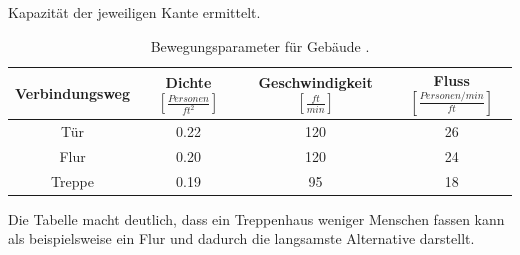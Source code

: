 \documentclass[a4paper, 11pt]{scrreprt}
\begin{document}
Kapazität der jeweiligen Kante ermittelt.
\begin{table}[htb!]
\centering
\caption{Bewegungsparameter für Gebäude \cite{movement_params}.}
\label{tab:movement_params}
\begin{tabular}[c]{|c|c|c|c|}\hline
 Verbindungsweg  & Dichte $[\frac{Personen}{ft^2}]$  & Geschwindigkeit $[\frac{ft}{min}]$ & Fluss $[\frac{Personen / min}{ft}]$   \\\hline\hline
  Tür   & 0.22 & 120 & 26  \\\hline
  Flur  & 0.20 & 120 & 24  \\\hline
  Treppe& 0.19 &  95 & 18  \\\hline
\end{tabular}
\end{table}
Die Tabelle macht deutlich, dass ein Treppenhaus weniger Menschen fassen kann als beispielsweise ein
Flur und dadurch die langsamste Alternative darstellt.
\end{document}
